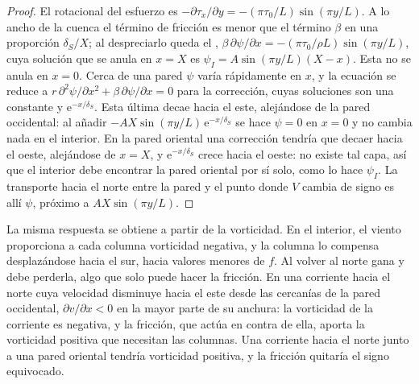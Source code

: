 \begin{proof}
El rotacional del esfuerzo es $-\partial\tau_x/\partial y = -(\pi\tau_0/L)\sin(\pi
y/L)$. A lo ancho de la cuenca el término de fricción es menor que el
término $\beta$ en una proporción $\delta_S/X$; al despreciarlo queda el ,
$\beta\,\partial\psi/\partial x = -(\pi\tau_0/\rho L)\sin(\pi y/L)$, cuya
solución que se anula en $x = X$ es $\psi_I = A\sin(\pi y/L)(X - x)$. Esta
no se anula en $x = 0$. Cerca de una pared $\psi$ varía rápidamente en $x$, y la
ecuación se reduce a $r\,\partial^2\psi/\partial x^2 + \beta\,\partial\psi/
\partial x = 0$ para la corrección, cuyas soluciones son una constante y
$\mathrm e^{-x/\delta_S}$. Esta última decae hacia el este, alejándose de la
pared occidental: al añadir $-AX\sin(\pi y/L)\,\mathrm e^{-x/\delta_S}$ se hace $\psi = 0$
en $x = 0$ y no cambia nada en el interior. En la pared oriental una
corrección tendría que decaer hacia el oeste, alejándose de $x = X$, y
$\mathrm e^{-x/\delta_S}$ crece hacia el oeste: no existe tal capa, así que el
interior debe encontrar la pared oriental por sí solo, como lo hace $\psi_I$. La
transporte hacia el norte entre la pared y el punto donde $V$ cambia de signo
es allí $\psi$, próximo a $AX\sin(\pi y/L)$.
\end{proof}

La misma respuesta se obtiene a partir de la vorticidad. En el interior, el viento proporciona
a cada columna vorticidad negativa, y la columna lo compensa desplazándose
hacia el sur, hacia valores menores de $f$. Al volver al norte gana 
y debe perderla, algo que solo puede hacer la fricción. En una corriente hacia el norte
cuya velocidad disminuye hacia el este desde las cercanías de la pared occidental, $\partial
v/\partial x < 0$ en la mayor parte de su anchura: la vorticidad de la corriente es negativa, y la fricción, que actúa en contra
de ella, aporta la vorticidad positiva que necesitan las columnas. Una corriente hacia el norte
junto a una pared oriental tendría vorticidad positiva, y
la fricción quitaría el signo equivocado.

